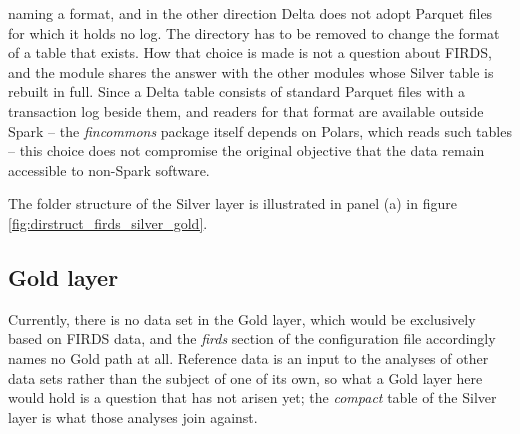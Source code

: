 naming a format, and in the other direction Delta does not adopt Parquet files for which it holds no log. The directory has to be removed to change the format of a table that exists. How that choice is made is not a question about FIRDS, and the module shares the answer with the other modules whose Silver table is rebuilt in full. Since a Delta table consists of standard Parquet files with a transaction log beside them, and readers for that format are available outside Spark -- the \emph{fincommons} package itself depends on Polars, which reads such tables -- this choice does not compromise the original objective that the data remain accessible to non-Spark software.

The folder structure of the Silver layer is illustrated in panel (a) in figure \ref{fig:dirstruct_firds_silver_gold}.


\subsection{Gold layer}

Currently, there is no data set in the Gold layer, which would be exclusively based on FIRDS data, and the \emph{firds} section of the configuration file accordingly names no Gold path at all. Reference data is an input to the analyses of other data sets rather than the subject of one of its own, so what a Gold layer here would hold is a question that has not arisen yet; the \emph{compact} table of the Silver layer is what those analyses join against.


